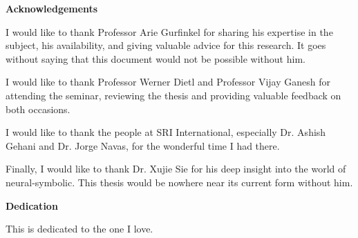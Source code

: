 \cleardoublepage


\begin{center}\textbf{Acknowledgements}\end{center}
I would like to thank Professor Arie Gurfinkel for sharing his  expertise  in  the  subject, his availability, and  giving  valuable  advice  for  this  research. It goes without saying that this document would not be possible without him. 

I would like to thank Professor Werner Dietl and Professor Vijay Ganesh for attending the seminar, reviewing the thesis and providing valuable feedback on both occasions. 

I would like to thank the people at SRI International, especially Dr. Ashish Gehani and Dr. Jorge Navas, for the wonderful time I had there.

Finally, I would like to thank Dr. Xujie Sie for his deep insight into the world of neural-symbolic. This thesis would be nowhere near its current form without him.
\cleardoublepage


\begin{center}\textbf{Dedication}\end{center}

This is dedicated to the one I love.
\cleardoublepage

\renewcommand\contentsname{Table of Contents}
\tableofcontents
\cleardoublepage
{}    %

\listoftables
\cleardoublepage
{}		%

\listoffigures
\cleardoublepage
{}		%

\printglossaries
\cleardoublepage
{}		%


